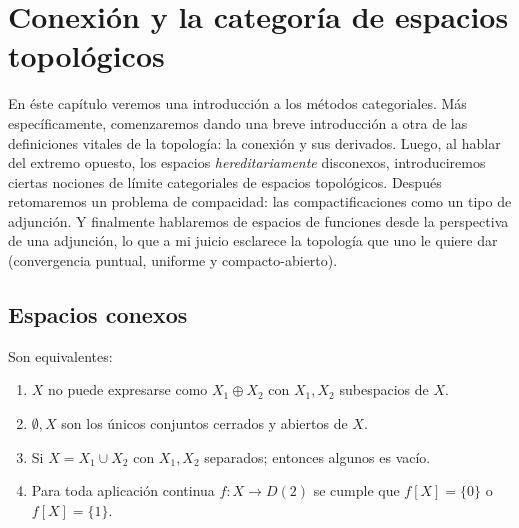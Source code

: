 \documentclass[topologia-analisis.tex]{subfiles}
\begin{document}
\newrefsegment
\chapter{Conexión y la categoría de espacios topológicos}
\label{cha:normed_spaces}

En éste capítulo veremos una introducción a los métodos categoriales.
Más específicamente, comenzaremos dando una breve introducción a otra de las definiciones vitales de la topología: la conexión y sus derivados.
Luego, al hablar del extremo opuesto, los espacios \textit{hereditariamente} disconexos, introduciremos ciertas nociones de límite categoriales
de espacios topológicos.
Después retomaremos un problema de compacidad: las compactificaciones como un tipo de adjunción.
Y finalmente hablaremos de espacios de funciones desde la perspectiva de una adjunción, lo que a mi juicio esclarece la topología que uno le quiere dar
(convergencia puntual, uniforme y compacto-abierto).

\section{Espacios conexos}
\begin{prop}
	Son equivalentes:
	\begin{enumerate}
		\item $X$ no puede expresarse como $X_1\oplus X_2$ con $X_1,X_2$ subespacios de $X$.
		\item $\emptyset, X$ son los únicos conjuntos cerrados y abiertos de $X$.
		\item Si $X = X_1\cup X_2$ con $X_1,X_2$ separados; entonces algunos es vacío.
		\item Para toda aplicación continua $f\colon X \to D(2)$ se cumple que $f[X] = \{0\}$ o $f[X] = \{1\}$.
	\end{enumerate}
\end{prop}
\end{document}
